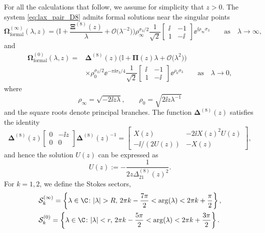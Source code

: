 For all the calculations that follow, we assume for simplicity that $z > 0$. The system \eqref{eq:lax_pair_D8} admits formal solutions near the singular points
\begin{equation}\label{eq:Omega-expand-infty-early}
\mathbf{\Omega}_{\text{formal}}^{(\infty)}(\lambda,z) = \bigg( \mathbb{I} + \frac{\mathbf{\Xi}^{(8)}(z)}{\lambda}+\mathcal{O}\big(\lambda^{-2}\big) \bigg) \rho_\infty^{\sigma_3/2}
 {\dfrac{1}{\sqrt{2}}} \begin{bmatrix} \ii & -1\\ 1 &-\ii \end{bmatrix} \ee^{\ii \rho_\infty \sigma_3} \qquad \text{as} \quad \lambda \to \infty,
\end{equation}
and
\begin{align}
\mathbf{\Omega}^{(0)}_{\text{formal}}(\lambda, z) ={}& {\mathbf{\Delta}}^{(8)}(z)\big( \mathbb{I} +\mathbf{\Pi}(z)\lambda+ \mathcal{O}\big(\lambda^2\big) \big)\nonumber\\
&\times\rho_0^{\sigma_3/2} \ee^{-\pi \ii \sigma_3/4}{\dfrac{1}{\sqrt{2}}} {}{} \begin{bmatrix} \ii & -1 \\ 1 &-\ii \end{bmatrix} \ee^{ \rho_0 \sigma_3} \qquad \text{as} \quad \lambda \to 0,\label{eq:Omega-expand-zero-early}
\end{align}
where
\begin{equation*}
\rho_\infty=\sqrt{-2 \ii z\lambda},\qquad \rho_0= \sqrt{2 \ii z\lambda^{-1}}
\end{equation*}
 and the square roots denote principal branches.
The function ${\mathbf{\Delta}}^{(8)}(z)$ satisfies the identity
\begin{equation}
{\mathbf{\Delta}}^{(8)}(z)\begin{bmatrix}0&-\ii z\\0&0\end{bmatrix}{\mathbf{\Delta}}^{(8)}(z)^{-1}=\begin{bmatrix}X(z) & -2\ii X(z)^2U(z)\\-\ii/(2U(z)) & -X(z)\end{bmatrix},
\label{eq:Delta-U-X-identity}
\end{equation}
and hence the solution $U(z)$ can be expressed as
\begin{equation}\label{eq:un-U-early}
U(z):=-\frac{1}{2z\Delta^{(8)}_{21}(z)^2}.
\end{equation}
For $k = 1, 2$, we define the Stokes sectors,
\begin{align*}
&\mathcal S_k^{(\infty)}= \left \{ \lambda \in \C \colon  |\lambda| > R, \, 2\pi k - \frac{7\pi}{2} < \arg (\lambda) < 2\pi k+\frac{\pi}{2} \right \},\\
&\mathcal S_k^{(0)}= \left \{ \lambda \in \C \colon  |\lambda| < r, \, 2\pi k - \frac{5\pi}{2} < \arg (\lambda) < 2\pi k+\frac{3\pi}{2}\right \}.
\end{align*}

